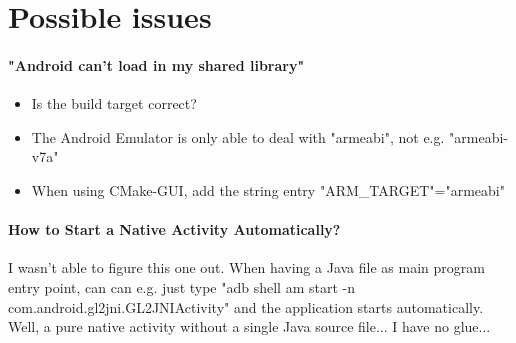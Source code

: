 \section{Possible issues}


\paragraph{"Android can't load in my shared library"}
\begin{itemize}
\item{Is the build target correct?}
\item{The Android Emulator is only able to deal with "armeabi", not e.g. "armeabi-v7a"}
\item{\textrightarrow  When using CMake-GUI, add the string entry "ARM\_TARGET"="armeabi"}
\end{itemize}


\paragraph{How to Start a Native Activity Automatically?}
I wasn't able to figure this one out. When having a Java file as main program entry point, can can e.g. just type "adb shell am start -n com.android.gl2jni.GL2JNIActivity" and the application starts automatically. Well, a pure native activity without a single Java source file... I have no glue...

